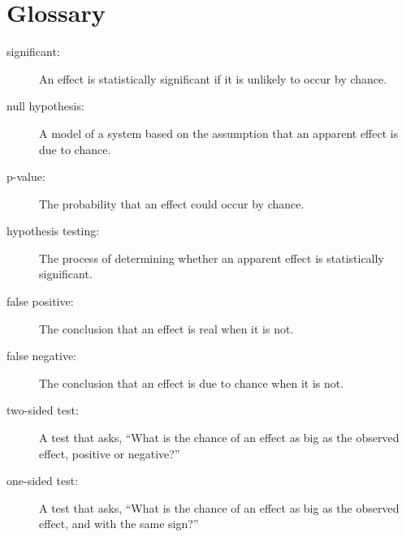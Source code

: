 \documentclass[12pt]{book}
\begin{document}












\section{Glossary}

\begin{description}

\item[significant:] An effect is statistically significant if it is unlikely
to occur by chance.

\item[null hypothesis:] A model of a system based on the assumption that
an apparent effect is due to chance.

\item[p-value:] The probability that an effect could occur by chance.

\item[hypothesis testing:] The process of determining whether an apparent
effect is statistically significant.

\item[false positive:] The conclusion that an effect is real when it is not.

\item[false negative:] The conclusion that an effect is due to chance when it
is not.

\item[two-sided test:] A test that asks, ``What is the chance of an effect
as big as the observed effect, positive or negative?''

\item[one-sided test:] A test that asks, ``What is the chance of an effect
as big as the observed effect, and with the same sign?''



\end{description}
\end{document}
